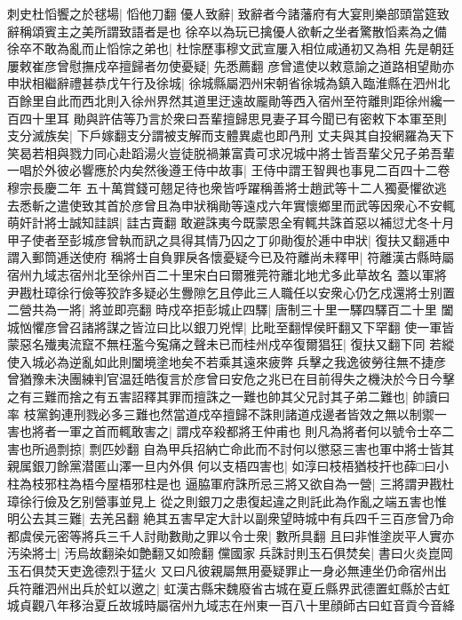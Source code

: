 刺史杜慆饗之於毬場|{
	慆他刀翻}
優人致辭|{
	致辭者今諸藩府有大宴則樂部頭當筵致辭稱頌賓主之美所謂致語者是也}
徐卒以為玩已擒優人欲斬之坐者驚散慆素為之備徐卒不敢為亂而止慆悰之弟也|{
	杜悰歷事穆文武宣屢入相位咸通初又為相}
先是朝廷屢敕崔彦曾慰撫戍卒擅歸者勿使憂疑|{
	先悉薦翻}
彦曾遣使以敕意諭之道路相望勛亦申狀相繼辭禮甚恭戊午行及徐城|{
	徐城縣屬泗州宋朝省徐城為鎮入臨淮縣在泗州北百餘里自此而西北則入徐州界然其道里迂遠故龎勛等西入宿州至符離則距徐州纔一百四十里耳}
勛與許佶等乃言於衆曰吾輩擅歸思見妻子耳今聞已有密敕下本軍至則支分滅族矣|{
	下戶嫁翻支分謂被支解而支體異處也即冎刑}
丈夫與其自投網羅為天下笑曷若相與戮力同心赴蹈湯火豈徒脱禍兼富貴可求况城中將士皆吾輩父兄子弟吾輩一唱於外彼必響應於内矣然後遵王侍中故事|{
	王侍中謂王智興也事見二百四十二卷穆宗長慶二年}
五十萬賞錢可翹足待也衆皆呼躍稱善將士趙武等十二人獨憂懼欲逃去悉斬之遣使致其首於彦曾且為申狀稱勛等遠戍六年實懷鄉里而武等因衆心不安輒萌奸計將士誠知詿誤|{
	詿古賣翻}
敢避誅夷今既蒙恩全宥輒共誅首惡以補愆尤冬十月甲子使者至彭城彦曾執而訊之具得其情乃囚之丁卯勛復於逓中申狀|{
	復扶又翻逓中謂入郵筒逓送使府}
稱將士自負罪戾各懷憂疑今已及符離尚未釋甲|{
	符離漢古縣時屬宿州九域志宿州北至徐州百二十里宋白曰爾雅莞符離北地尤多此草故名}
蓋以軍將尹戡杜璋徐行儉等狡詐多疑必生釁隙乞且停此三人職任以安衆心仍乞戍還將士别置二營共為一將|{
	將並即亮翻}
時戍卒拒彭城止四驛|{
	唐制三十里一驛四驛百二十里}
闔城忷懼彦曾召諸將謀之皆泣曰比以銀刀兇悍|{
	比毗至翻悍侯盰翻又下罕翻}
使一軍皆蒙惡名殱夷流竄不無枉濫今寃痛之聲未已而桂州戍卒復爾猖狂|{
	復扶又翻下同}
若縱使入城必為逆亂如此則闔境塗地矣不若乘其遠來疲弊兵擊之我逸彼勞往無不捷彦曾猶豫未決團練判官温廷皓復言於彦曾曰安危之兆已在目前得失之機決於今日今擊之有三難而捨之有五害詔釋其罪而擅誅之一難也帥其父兄討其子弟二難也|{
	帥讀曰率}
枝黨鉤連刑戮必多三難也然當道戍卒擅歸不誅則諸道戍邊者皆效之無以制禦一害也將者一軍之首而輒敢害之|{
	謂戍卒殺都將王仲甫也}
則凡為將者何以號令士卒二害也所過剽掠|{
	剽匹妙翻}
自為甲兵招納亡命此而不討何以懲惡三害也軍中將士皆其親属銀刀餘黨潜匿山澤一旦内外俱何以支梧四害也|{
	如淳曰枝梧猶枝扞也薛□曰小柱為枝邪柱為梧今屋梧邪柱是也}
逼脇軍府誅所忌三將又欲自為一營|{
	三將謂尹戡杜璋徐行儉及乞别營事並見上}
從之則銀刀之患復起違之則託此為作亂之端五害也惟明公去其三難|{
	去羌呂翻}
絶其五害早定大計以副衆望時城中有兵四千三百彦曾乃命都虞侯元密等將兵三千人討勛數勛之罪以令士衆|{
	數所具翻}
且曰非惟塗炭平人實亦汚染將士|{
	汚烏故翻染如艶翻又如險翻}
儻國家兵誅討則玉石俱焚矣|{
	書曰火炎崑岡玉石俱焚天吏逸德烈于猛火}
又曰凡彼親屬無用憂疑罪止一身必無連坐仍命宿州出兵符離泗州出兵於虹以邀之|{
	虹漢古縣宋魏廢省古城在夏丘縣界武德置虹縣於古虹城貞觀八年移治夏丘故城時屬宿州九域志在州東一百八十里顔師古曰虹音貢今音絳}
